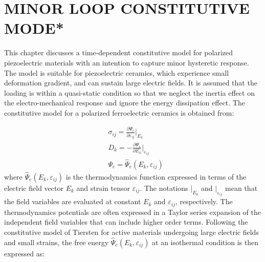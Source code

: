 \chapter{\uppercase {minor loop constitutive mode*}}
\label{section:minor_loop_constitutive_model_for_polarized_piezo_electric}
This chapter discusses a time-dependent constitutive model for polarized piezoelectric materials with an intention to capture minor hysteretic response.
The model is suitable for piezoelectric ceramics, which experience small deformation gradient, and can sustain large electric fields. 
It is assumed that the loading is within a quasi-static condition so that we neglect the inertia effect on the electro-mechanical response and ignore the energy dissipation effect. 
The constitutive model for a polarized ferroelectric ceramics is obtained from:


\begin{equation}
\begin{aligned}
&\sigma _{ij} = \frac{\partial \Psi_e}{\partial \varepsilon_{ij}}\vert _{E_{k}}
\\
& D_k = -\frac{\partial \Psi_e}{\partial E_k}\vert _{\varepsilon_{ij}}\\
& \Psi_e= \hat{\Psi}_e(E_k,\varepsilon_{ij})
\end{aligned}
\label{EQN:Derivation_from_gibbs}
\end{equation}
where $\hat{\Psi}_e(E_k,\varepsilon_{ij})$ is the thermodynamics function expressed in terms of the electric field vector $E_k$ and strain tensor $\varepsilon_{ij}$. 
The notations $\vert _{E_{k}}$ and $\vert _{\varepsilon_{ij}}$ mean that the field variables are evaluated at constant $E_{k}$ and $\varepsilon_{ij}$, respectively.
The thermodynamics potentials are often expressed in a Taylor series expansion of the independent field variables that can include higher order terms. 
Following the constitutive model of Tiersten \cite{tiersten1993electroelastic}
for active materials undergoing large electric fields and small strains, 
the free energy $\hat{\Psi}_e(E_k,\varepsilon_{ij})$ at an isothermal condition is then expressed as:

